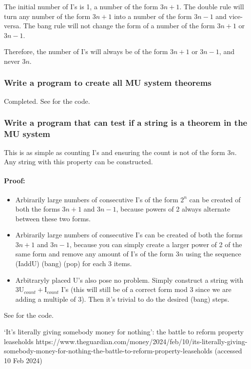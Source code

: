 \documentclass{article}
\begin{document}
The initial number of I's is 1, a number of the form $3n+1$.
The double rule will turn any number of the form $3n+1$ into
a number of the form $3n-1$ and vice-versa.
The bang rule will not change the form of a number of the form
$3n+1$ or $3n-1$.

Therefore, the number of I's will always be of the form
$3n+1$ or $3n-1$, and never $3n$.

\subsubsection{Write a program to create all MU system theorems}
Completed. See  for the code.

\subsubsection{Write a program that can test if a string is a
theorem in the MU system}
This is as simple as counting I's and ensuring the count is not
of the form $3n$. Any string with this property can be constructed.

\paragraph{Proof:}

\begin{itemize}
	\item Arbirarily large numbers of consecutive I's
		of the form $2^n$ can be
		created of both the forms $3n+1$ and $3n-1$, because
		powers of 2 always alternate between these two forms.

	\item Arbirarily large numbers of consecutive I's can be
		created of both the forms $3n+1$ and $3n-1$, because you
		can simply create a larger power of 2 of the same form
		and remove any amount of I's of the form $3n$ using the
		sequence (IaddU) (bang) (pop) for each 3 items.
	
	\item Arbitraryly placed U's also pose no problem. Simply
		construct a string with
		$3\text{U}_{count}+\text{I}_{count}$
		I's (this will still be of a correct form mod 3
		since we are adding a multiple of 3).
		Then it's trivial to do the desired (bang) steps.
	
\end{itemize}

See  for the code.

\pagebreak
\begin{thebibliography}{}
‘It’s literally giving somebody money for nothing’: the battle to reform property leaseholds
https://www.theguardian.com/money/2024/feb/10/its-literally-giving-somebody-money-for-nothing-the-battle-to-reform-property-leaseholds
(accessed 10 Feb 2024)
\end{thebibliography}
\end{document}
